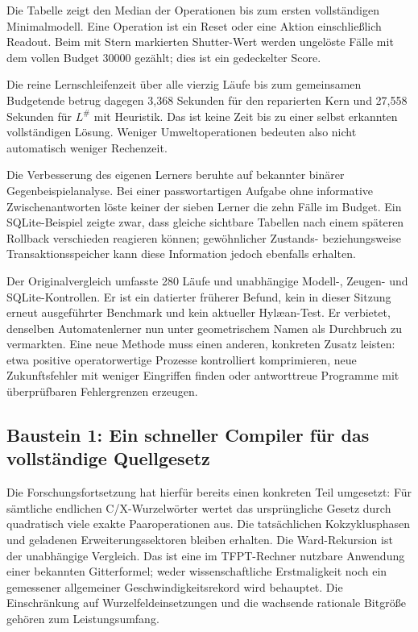 Die Tabelle zeigt den Median der Operationen bis zum ersten vollständigen Minimalmodell. Eine Operation ist ein Reset oder eine Aktion einschließlich Readout. Beim mit Stern markierten Shutter-Wert werden ungelöste Fälle mit dem vollen Budget 30000 gezählt; dies ist ein gedeckelter Score.

Die reine Lernschleifenzeit über alle vierzig Läufe bis zum gemeinsamen Budgetende betrug dagegen 3,368 Sekunden für den reparierten Kern und 27,558 Sekunden für $L^{\#}$ mit Heuristik. Das ist keine Zeit bis zu einer selbst erkannten vollständigen Lösung. Weniger Umweltoperationen bedeuten also nicht automatisch weniger Rechenzeit.

Die Verbesserung des eigenen Lerners beruhte auf bekannter binärer Gegenbeispielanalyse. Bei einer passwortartigen Aufgabe ohne informative Zwischenantworten löste keiner der sieben Lerner die zehn Fälle im Budget. Ein SQLite-Beispiel zeigte zwar, dass gleiche sichtbare Tabellen nach einem späteren Rollback verschieden reagieren können; gewöhnlicher Zustands- beziehungsweise Transaktionsspeicher kann diese Information jedoch ebenfalls erhalten.

Der Originalvergleich umfasste 280 Läufe und unabhängige Modell-, Zeugen- und SQLite-Kontrollen. Er ist ein datierter früherer Befund, kein in dieser Sitzung erneut ausgeführter Benchmark und kein aktueller Hylæan-Test. Er verbietet, denselben Automatenlerner nun unter geometrischem Namen als Durchbruch zu vermarkten. Eine neue Methode muss einen anderen, konkreten Zusatz leisten: etwa positive operatorwertige Prozesse kontrolliert komprimieren, neue Zukunftsfehler mit weniger Eingriffen finden oder antworttreue Programme mit überprüfbaren Fehlergrenzen erzeugen.

\subsection{Baustein 1: Ein schneller Compiler für das vollständige Quellgesetz}
Die Forschungsfortsetzung hat hierfür bereits einen konkreten Teil umgesetzt: Für sämtliche endlichen C/X-Wurzelwörter wertet  das ursprüngliche Gesetz durch quadratisch viele exakte Paaroperationen aus. Die tatsächlichen Kokzyklusphasen und geladenen Erweiterungssektoren bleiben erhalten. Die Ward-Rekursion ist der unabhängige Vergleich. Das ist eine im TFPT-Rechner nutzbare Anwendung einer bekannten Gitterformel; weder wissenschaftliche Erstmaligkeit noch ein gemessener allgemeiner Geschwindigkeitsrekord wird behauptet. Die Einschränkung auf Wurzelfeldeinsetzungen und die wachsende rationale Bitgröße gehören zum Leistungsumfang.

